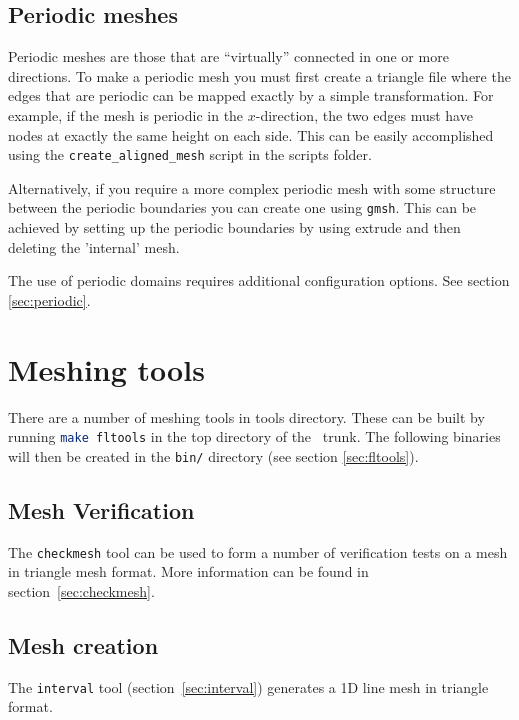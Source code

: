 \subsection{Periodic meshes}
\label{sec:periodic_meshes}
Periodic meshes are those that are ``virtually'' connected in one or more directions. To make a periodic
mesh you must first create a triangle file where the edges that are periodic
can be mapped exactly by a simple transformation. For example, if the mesh
is periodic in the $x$-direction, the two edges must have nodes at exactly the
same height on each side. This can be easily accomplished using the
\lstinline[language=Bash]+create_aligned_mesh+ script in the scripts folder.

Alternatively, if you require a more complex periodic mesh with some structure between the periodic 
boundaries you can create one using \lstinline[language=Bash]{gmsh}. This can be achieved by 
setting up the periodic boundaries by using extrude and then deleting the 'internal' mesh.

The use of periodic domains requires additional configuration options. See
section \ref{sec:periodic}.

\section{Meshing tools}

There are a number of meshing tools in tools directory. These can be built by running 
\lstinline[language = bash]+make fltools+ in the top directory of the \fluidity\ trunk.
The following binaries will then be created in the \lstinline+bin/+ directory (see section \ref{sec:fltools}).

\subsection{Mesh Verification}

The \lstinline[language = Bash]+checkmesh+ tool can be used to form a number of verification tests on a mesh
in triangle mesh format. More information can be found in section~\ref{sec:checkmesh}.

\subsection{Mesh creation}
The \lstinline[language = bash]+interval+ tool (section~\ref{sec:interval}) generates a 1D line mesh in triangle format. 

